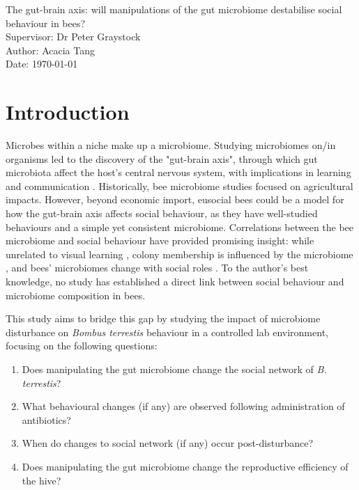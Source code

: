 \documentclass[11pt]{article} %
\begin{document}
    \begin{titlepage}\centering
    \vspace*{\fill}
    \LARGE The gut-brain axis: will manipulations of the gut microbiome destabilise social behaviour in bees?\\
    \vspace{\baselineskip}
    \LARGE Supervisor: Dr Peter Graystock\\
    \vspace{\baselineskip}
    \normalsize Author: Acacia Tang\\
    \normalsize Date: {\today}
    \vspace*{\fill}
    \end{titlepage}

    \newpage
    \section{Introduction}
        Microbes within a niche make up a microbiome.
        Studying microbiomes on/in organisms led to the discovery of the "gut-brain axis",
        through which gut microbiota affect the host's central nervous system,
        with implications in learning and communication
        \parencite{archie2015social}.
        Historically, bee microbiome studies focused on agricultural impacts.
        However, beyond economic import,
        eusocial bees could be a model for how the gut-brain axis affects social behaviour,
        as they have well-studied behaviours and a simple yet consistent microbiome.
        Correlations between the bee microbiome and social behaviour have provided promising insight:
        while unrelated to visual learning
        \parencite{leger2020gut},
        colony membership is influenced by the microbiome
        \parencite{vernier2020gut},
        and bees' microbiomes change with social roles
        \parencite{jones2018gut}.
        To the author's best knowledge, no study has established a direct link between social behaviour and microbiome composition in bees.
      
        This study aims to bridge this gap by studying the impact of microbiome disturbance on \textit{Bombus terrestis} behaviour in a controlled lab environment,
        focusing on the following questions:
        \begin{enumerate}[noitemsep,topsep=0pt]
            \item Does manipulating the gut microbiome change the social network of \textit{B. terrestis}?
            \item What behavioural changes (if any) are observed following administration of antibiotics?
            \item When do changes to social network (if any) occur post-disturbance?
            \item Does manipulating the gut microbiome change the reproductive efficiency of the hive?
        \end{enumerate}
 
\end{document}
